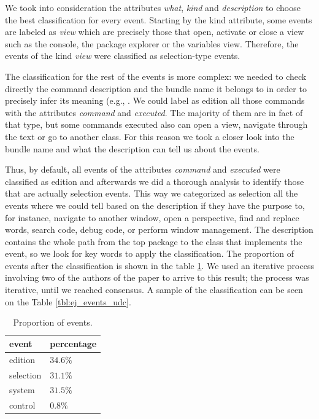 \documentclass[times]{smrauth}
\begin{document}
We took into consideration the attributes \textit{what}, \textit{kind} and \textit{description} to choose the best classification for every event. Starting by the kind attribute, some events are labeled as \textit{view} which are precisely those that open, activate or close a view such as the console, the package explorer or the variables view. Therefore, the events of the kind \textit{view} were classified as selection-type events.

The classification for the rest of the events is more complex: we needed to check directly the command description and the bundle name it belongs to in order to precisely infer its meaning (e.g., . We could label as edition all those commands with the attributes \textit{command} and \textit{executed}. The majority of them are in fact of that type, but some commands executed also can open a view, navigate through the text or go to another class. For this reason we took a closer look into the bundle name and what the description can tell us about the events.

Thus, by default, all events of the attributes \textit{command} and \textit{executed} were classified as edition and afterwards we did a thorough analysis to identify those that are actually selection events.  This way we categorized as selection all the events where we could tell based on the description if they have the purpose to, for instance, navigate to another window, open a perspective, find and replace words, search code, debug code, or perform window management. The description contains the whole path from the top package to the class that implements the event, so we look for key words to apply the classification. The proportion of events after the classification is shown in the table \ref{tbl:prop_events_udc}.
We used an iterative process involving two of the authors of the paper to arrive to this result; the process was iterative, until we reached consensus. A sample of the classification can be seen on the Table \ref{tbl:ej_events_udc}.

\begin{table}[ht!]
\renewcommand{\arraystretch}{1.3}
\caption{Proportion of events. }
\label{tbl:prop_events_udc}
\centering
\begin{tabular}{|p{1.7cm}|p{2 cm}|} 
  \hline 
event & percentage \\  
  \hline 
    \hline 
edition &  $34.6\%$  \\
selection & $31.1\%$ \\
system & $31.5\%$  \\
control & $0.8\%$  \\
\hline
\end{tabular}
\end{table}
\end{document}
